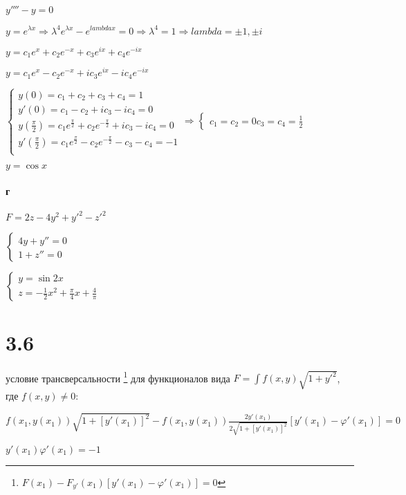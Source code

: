 \documentclass[russian]{article}
\begin{document}
$y'''' - y= 0$

$y=e^{\lambda x} \Rightarrow \lambda ^4 e^{\lambda x} - e^{
lambda x} = 0 \Rightarrow \lambda^4 = 1 \Rightarrow 
lambda = \pm 1, \pm i$

$y=c_1 e^x + c_2 e^{-x} + c_3 e^{i x} + c_4 e^{-i x}$

$y=c_1 e^x - c_2 e^{-x} + i c_3 e^{i x} - i c_4 e^{-i x}$

$\begin{cases}
y(0) = c_1 + c_2 + c_3 + c_4 = 1\\
y'(0) = c_1 - c_2 + i c_3 - i c_4 = 0\\
y(\frac{\pi}{2}) = c_1 e^\frac{\pi}{2} + c_2 e^{-\frac{\pi}{2}} + i c_3 - i c_4 = 0\\
y'(\frac{\pi}{2}) = c_1 e^\frac{\pi}{2} - c_2 e^{-\frac{\pi}{2}} - c_3 - c_4 = -1\\
\end{cases}
\Rightarrow
\begin{cases}
c_1 = c_2 = 0
c_3 = c_4 = \frac{1}{2}
\end{cases}$

$y= \cos x$

\paragraph*{г}

$ F = 2z - 4y^2 + y'^2 - z'^2 $

$\begin{cases}
4 y + y'' = 0 \\
1 + z'' = 0
\end{cases}$

$\begin{cases}
y = \sin 2x \\
z = -\frac{1}{2} x^2 + \frac{\pi}{4} x + \frac{4}{\pi}
\end{cases}$

\section*{3.6}

условие трансверсальности \footnote{
	$F(x_1)-F_{y'}(x_1)[y'(x_1)-\varphi'(x_1)] = 0$
}
для функционалов вида $F=\int f(x,y)\sqrt{1+y'^2}$, где $f(x,y) \ne 0$:

$f(x_1, y(x_1))\sqrt{1+[y'(x_1)]^2} - f(x_1, y(x_1)) \frac{2y'(x_1)}{2\sqrt{1 + [y'(x_1)]^2}}[y'(x_1) - \varphi'(x_1)] = 0$

$y'(x_1)\varphi'(x_1)=-1$
\end{document}
